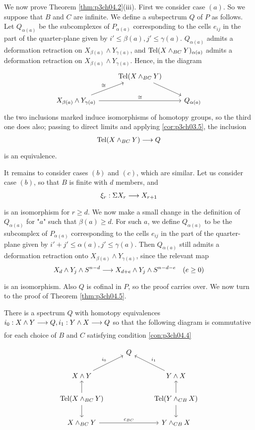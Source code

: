\documentclass[../main]{subfiles}
\begin{document}
We now prove Theorem \ref{thm:p3ch04.2}(iii). First we consider case $(a)$. So we suppose that $B$ and $C$ are infinite. We define a subspectrum $Q$ of $P$ as follows. Let $Q_{\alpha(a)}$ be the subcomplexes of $P_{\alpha(a)}$ corresponding to the cells $e_{ij}$ in the part of the quarter-plane given by $i'\leq \beta(a),j'\le \gamma(a)$. $Q_{\alpha(a)}$ admits a deformation retraction on $X_{\beta(a)}\wedge Y_{\gamma(a)}$, and $\mathrm{Tel}(X\wedge_{BC} Y)_{\alpha(a)}$ admits a deformation retraction on $X_{\beta(a)}\wedge Y_{\gamma(a)}$. Hence, in the diagram
\[\begin{tikzcd}
& \te{Tel}(X\wedge_{BC}Y)\arrow[dr]&\\ X_{\beta(a)}\wedge Y_{\gamma(a)} \arrow[ur,"\cong"] \arrow[rr,"\cong"] && Q_{\alpha(a)}
\end{tikzcd}\]
the two inclusions marked induce isomorphisms of homotopy groups, so
the third one does also; passing to direct limits and applying \ref{cor:p3ch03.5}, the inclusion \[\te{Tel}(X\wedge_{BC}Y)\lar{}Q\]
is an equivalence.

It remains to consider cases $(b)$ and $(c)$, which are similar. Let us consider case $(b)$, so that $B$ is finite with $d$ members, and 
\[\xi_r:\Sigma X_r\lar{}X_{r+1}\] is an isomorphism for $r\geq d$. We now make a small change in the definition of $Q_{\alpha(a)}$ for "$a$" such that $\beta(a)\geq d$. For such $a$, we define $Q_{\alpha(a)}$ to be the subcomplex of $P_{\alpha(a)}$ corresponding to the cells $e_{ij}$ in the part of the quarter-plane given by $i'+j'\leq \alpha(a),j'\leq  \gamma(a)$. Then $Q_{\alpha(a)}$ still admits a deformation retraction onto $X_{\beta(a)}\wedge Y_{\gamma(a)}$, since the relevant map
\[X_d\wedge Y_j \wedge S^{n-d} \lar{} X_{d+e} \wedge Y_j \wedge S^{n-d-e}\quad (e\geq 0)\]
is an isomorphism. Also $Q$ is cofinal in $P$, so the proof carries over. We now turn to the proof of Theorem \ref{thm:p3ch04.5}.
\begin{lemma}\label{lem:p3ch04.6}
There is a spectrum $Q$ with homotopy equivalences $i_0:X\wedge Y\lar{} Q,i_1:Y\wedge X\lar{} Q$ so that the following diagram is commutative for each choice of $B$ and $C$ satisfying condition \ref{con:p3ch04.4}

\[\begin{tikzcd}
    & Q \\
    {X\wedge Y} && {Y\wedge X} \\
    {\text{Tel}(X\wedge_{BC}Y)} && {\text{Tel}(Y\wedge_{CB}X)} \\
    {X\wedge_{BC}Y} && {Y\wedge_{CB}X}
    \arrow["{c_{BC}}", from=4-1, to=4-3]
    \arrow[from=3-1, to=4-1]
    \arrow[from=3-1, to=2-1]
    \arrow[from=3-3, to=2-3]
    \arrow[from=3-3, to=4-3]
    \arrow["{i_0}", from=2-1, to=1-2]
    \arrow["{i_1}"', from=2-3, to=1-2]
\end{tikzcd}\]
\end{lemma}
\end{document}
